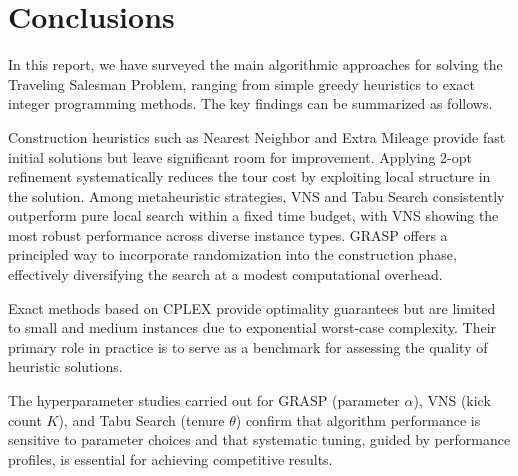 \documentclass{article}
\begin{document}
\section{Conclusions}

In this report, we have surveyed the main algorithmic approaches for solving the Traveling
Salesman Problem, ranging from simple greedy heuristics to exact integer programming methods.
The key findings can be summarized as follows.

Construction heuristics such as Nearest Neighbor and Extra Mileage provide fast initial
solutions but leave significant room for improvement. Applying 2-opt refinement
systematically reduces the tour cost by exploiting local structure in the solution. Among
metaheuristic strategies, VNS and Tabu Search consistently outperform pure local search
within a fixed time budget, with VNS showing the most robust performance across diverse
instance types. GRASP offers a principled way to incorporate randomization into the
construction phase, effectively diversifying the search at a modest computational overhead.

Exact methods based on CPLEX provide optimality guarantees but are limited to small and
medium instances due to exponential worst-case complexity. Their primary role in practice is
to serve as a benchmark for assessing the quality of heuristic solutions.

The hyperparameter studies carried out for GRASP (parameter $\alpha$), VNS (kick count $K$),
and Tabu Search (tenure $\theta$) confirm that algorithm performance is sensitive to
parameter choices and that systematic tuning, guided by performance profiles, is essential
for achieving competitive results.
\end{document}

